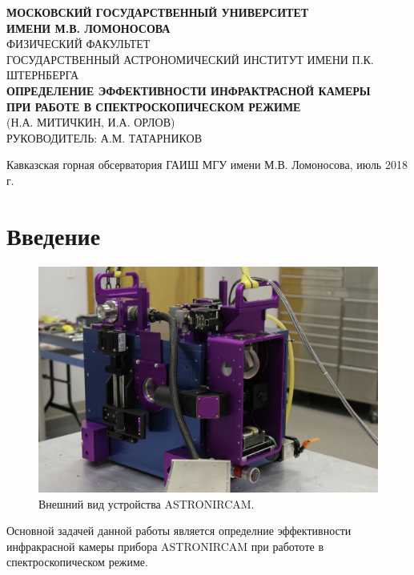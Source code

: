 \documentclass[a4paper]{article}
\begin{document}
\setcounter{page}{0} 
\begin{titlepage}
\begin{center}
\large{\textbf{МОСКОВСКИЙ ГОСУДАРСТВЕННЫЙ УНИВЕРСИТЕТ\\ИМЕНИ М.В. ЛОМОНОСОВА}}\\
\hfill\break
\normalsize{ФИЗИЧЕСКИЙ ФАКУЛЬТЕТ}\\
\hfill\break
\normalsize{ГОСУДАРСТВЕННЫЙ АСТРОНОМИЧЕСКИЙ ИНСТИТУТ ИМЕНИ П.К. ШТЕРНБЕРГА}\\
\hfill\break
\hfill\break
\hfill\break
\hfill\break
\hfill\break
\hfill\break
\hfill\break
\hfill\break
\hfill\break
\hfill\break
\Large{\textbf{ОПРЕДЕЛЕНИЕ ЭФФЕКТИВНОСТИ ИНФРАКТРАСНОЙ КАМЕРЫ\\ПРИ РАБОТЕ В СПЕКТРОСКОПИЧЕСКОМ РЕЖИМЕ}}\\
\hfill\break
\normalsize{(Н.А. МИТИЧКИН, И.А. ОРЛОВ)}\\
\hfill\break
\normalsize{РУКОВОДИТЕЛЬ: А.М. ТАТАРНИКОВ}\\
\end{center}
\hfill\break
\hfill\break
\hfill\break
\hfill\break
\hfill\break
\hfill\break
\hfill\break
\hfill\break
\hfill\break
\hfill\break
\hfill\break
\hfill\break
\hfill\break
\hfill\break
\hfill\break
\hfill\break 
\hfill\break
\hfill\break
\hfill\break
\begin{center}
Кавказская горная обсерватория ГАИШ МГУ имени М.В. Ломоносова, июль 2018 г.
\end{center}
\thispagestyle{empty}
\end{titlepage}
\newpage
\tableofcontents
\newpage
\section{Введение}
\begin{figure} 
\vspace{-4ex}
\includegraphics[width=\linewidth]{11}
\caption{Внешний вид устройства ASTRONIRCAM.}
\label{fig:1}
\end{figure}
Основной задачей данной работы является определние эффективности инфракрасной камеры прибора ASTRONIRCAM при работоте в спектроскопическом режиме.
\end{document}
